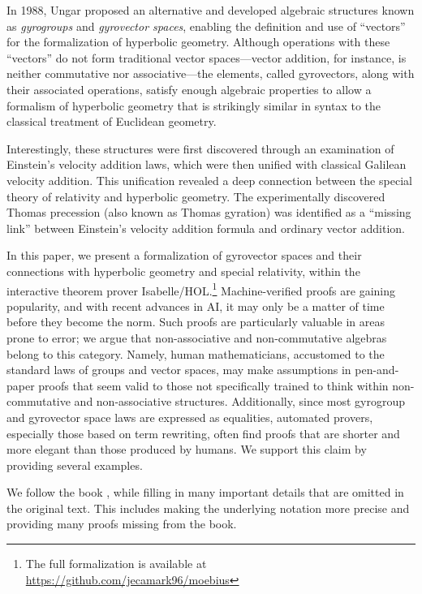 \documentclass[a4paper]{article}
\theoremstyle{definition}
\begin{document}
In 1988, Ungar \cite{ungar-analytic} proposed an alternative and
developed algebraic structures known as \emph{gyrogroups} and
\emph{gyrovector spaces}, enabling the definition and use of
``vectors'' for the formalization of hyperbolic geometry. Although
operations with these ``vectors'' do not form traditional vector
spaces—vector addition, for instance, is neither commutative nor
associative—the elements, called gyrovectors, along with their
associated operations, satisfy enough algebraic properties to allow a
formalism of hyperbolic geometry that is strikingly similar in syntax
to the classical treatment of Euclidean geometry.

Interestingly, these structures were first discovered through an
examination of Einstein's velocity addition laws, which were then
unified with classical Galilean velocity addition. This unification
revealed a deep connection between the special theory of relativity
and hyperbolic geometry. The experimentally discovered Thomas
precession (also known as Thomas gyration) was identified as a
``missing link'' between Einstein's velocity addition formula and
ordinary vector addition.\cite{ungar-analytic}

In this paper, we present a formalization of gyrovector spaces and
their connections with hyperbolic geometry and special relativity,
within the interactive theorem prover Isabelle/HOL.\footnote{The full
  formalization is available at
  \url{https://github.com/jecamark96/moebius}} Machine-verified proofs
are gaining popularity, and with recent advances in AI, it may only be
a matter of time before they become the norm. Such proofs are
particularly valuable in areas prone to error; we argue that
non-associative and non-commutative algebras belong to this category.
Namely, human mathematicians, accustomed to the standard laws of
groups and vector spaces, may make assumptions in pen-and-paper proofs
that seem valid to those not specifically trained to think within
non-commutative and non-associative structures. Additionally, since
most gyrogroup and gyrovector space laws are expressed as equalities,
automated provers, especially those based on term rewriting, often
find proofs that are shorter and more elegant than those produced by
humans. We support this claim by providing several examples.

We follow the book \cite{ungar-analytic}, while filling in many
important details that are omitted in the original text. This includes
making the underlying notation more precise and providing many proofs
missing from the book.
\end{document}
